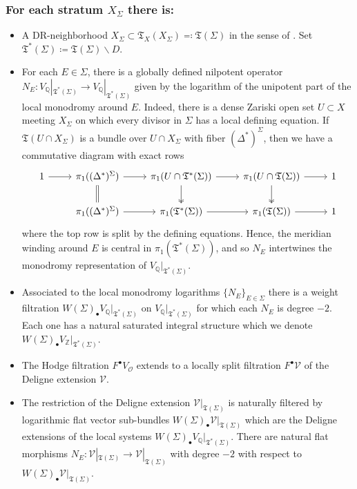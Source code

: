 \documentclass{amsart}
\newcommand{\bs}{\backslash}
\theoremstyle{definition}
\theoremstyle{remark}
\def\bZ{\mathbb{Z}}
\def\bQ{\mathbb{Q}}
\def\cO{\mathcal{O}}
\def\cV{\mathcal{V}}
\def\fT{\mathfrak{T}}
\def\fT{\mathfrak{T}}
\numberwithin{equation}{section}
\begin{document}
\subsubsection{For each stratum $X_\Sigma $ there is:}
\begin{itemize}
    \item A DR-neighborhood $X_\Sigma \subset   {\mathfrak{T}_X(X_\Sigma) } \eqqcolon \fT(\Sigma)$ in the sense of .  Set $\fT^*(\Sigma) \coloneqq  {\mathfrak{T}(\Sigma) }\bs D$.
 
    \item For each $E\in \Sigma$, there is a globally
defined nilpotent operator  $N_{E}:V_\bQ|_{\fT^*(\Sigma)}\to V_\bQ|_{\fT^*(\Sigma)}$ given by the logarithm of the unipotent part of the local monodromy around $E$.  Indeed, there is a dense Zariski open set $U\subset X$ meeting $X_\Sigma$ on which every divisor in $\Sigma$ has a local defining equation.  If $\mathfrak{T}(U\cap X_\Sigma)$ is a bundle over $U\cap X_\Sigma$ with fiber $(\Delta^*)^{\Sigma}$, then we have a commutative diagram with exact rows
\begin{equation}\label{diagram:fibration}\begin{tikzcd}
1\ar[r]&\pi_1((\Delta^*)^{\Sigma})\ar[d, equals]\ar[r]&\pi_1(U\cap \fT^*(\Sigma))\ar[d,two heads]\ar[r]&\pi_1(U\cap \fT(\Sigma))\ar[d,two heads]\ar[r]&1\\
&\pi_1((\Delta^*)^{\Sigma})\ar[r]&\pi_1(\fT^*(\Sigma))\ar[r]&\pi_1(\fT(\Sigma))\ar[r]&1
\end{tikzcd}\end{equation}
where the top row is split by the defining equations.  Hence, the meridian winding around $E$ is central in $\pi_1(\fT^*(\Sigma))$, and so $N_{E}$ intertwines the monodromy representation of $V_\bQ|_{\fT^*(\Sigma)}$. 
   \item Associated to the local monodromy logarithms $\{N_E\}_{E\in\Sigma}$ there is a weight filtration $W(\Sigma)_\bullet V_\bQ|_{\fT^*(\Sigma)}$ on $V_\bQ|_{\fT^*(\Sigma)}$ for which each $N_E$ is degree $-2$.  Each one has a natural saturated integral structure which we denote $W(\Sigma)_\bullet V_\bZ|_{\fT^*(\Sigma)}$.

    \item The Hodge filtration $F^\bullet V_\cO$ extends to a locally split filtration $ F^\bullet \cV $ of the Deligne extension $\cV$.
    \item The restriction of the Deligne extension $ \cV|_{\mathfrak{T}(\Sigma)}$ is naturally filtered by logarithmic flat vector sub-bundles $W(\Sigma)_\bullet  \cV|_{\mathfrak{T}(\Sigma)}$ which are the Deligne extensions of the local systems $W(\Sigma)_\bullet V_\bQ|_{\fT^*(\Sigma)}$.  There are natural flat morphisms $N_E:\cV|_{\mathfrak{T}(\Sigma)}\to\cV|_{\mathfrak{T}(\Sigma)}$ with degree $-2$ with respect to $W(\Sigma)_\bullet  \cV|_{\mathfrak{T}(\Sigma)}$.  
    
\end{itemize}
\end{document}

